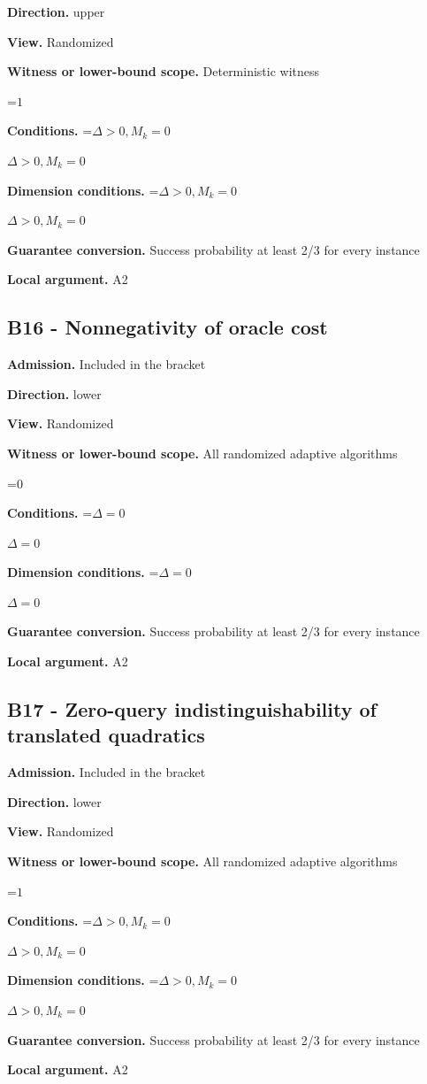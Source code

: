 \documentclass[10pt,a4paper]{article}
\newcommand{\AtlasMath}[1]{\par\begingroup\centering\setbox0=\hbox{$\displaystyle #1$}\ifdim\wd0>1.4\linewidth\typeout{ATLAS WIDE FORMULA: \the\wd0}\fi\ifdim\wd0>\linewidth\resizebox{\linewidth}{!}{\box0}\else\box0\fi\par\endgroup}
\newcommand{\AtlasInlineMath}[1]{\begingroup\setbox0=\hbox{$#1$}\ifdim\wd0>.4\linewidth\endgroup\AtlasMath{#1}\else\endgroup$#1$\fi}
\begin{document}
\textbf{Direction.} upper

\textbf{View.} Randomized

\textbf{Witness or lower-bound scope.} Deterministic witness

\AtlasMath{1}
\textbf{Conditions.} \AtlasInlineMath{\Delta>0, M_k=0}

\textbf{Dimension conditions.} \AtlasInlineMath{\Delta>0, M_k=0}

\textbf{Guarantee conversion.} Success probability at least 2/3 for every instance

\textbf{Local argument.} A2

\subsection{B16 - Nonnegativity of oracle cost}
\textbf{Admission.} Included in the bracket

\textbf{Direction.} lower

\textbf{View.} Randomized

\textbf{Witness or lower-bound scope.} All randomized adaptive algorithms

\AtlasMath{0}
\textbf{Conditions.} \AtlasInlineMath{\Delta=0}

\textbf{Dimension conditions.} \AtlasInlineMath{\Delta=0}

\textbf{Guarantee conversion.} Success probability at least 2/3 for every instance

\textbf{Local argument.} A2

\subsection{B17 - Zero-query indistinguishability of translated quadratics}
\textbf{Admission.} Included in the bracket

\textbf{Direction.} lower

\textbf{View.} Randomized

\textbf{Witness or lower-bound scope.} All randomized adaptive algorithms

\AtlasMath{1}
\textbf{Conditions.} \AtlasInlineMath{\Delta>0, M_k=0}

\textbf{Dimension conditions.} \AtlasInlineMath{\Delta>0, M_k=0}

\textbf{Guarantee conversion.} Success probability at least 2/3 for every instance

\textbf{Local argument.} A2
\end{document}
